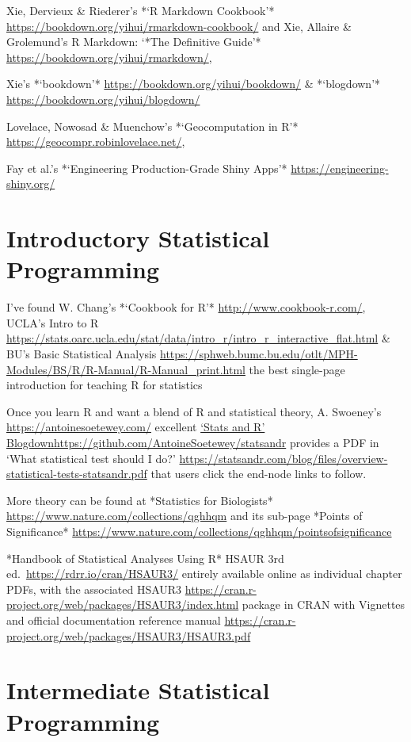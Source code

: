 \documentclass[
]{book}
\begin{document}
Xie, Dervieux \& Riederer's *`R Markdown Cookbook'* \url{https://bookdown.org/yihui/rmarkdown-cookbook/} and Xie, Allaire \& Grolemund's R Markdown: `*The Definitive Guide'* \url{https://bookdown.org/yihui/rmarkdown/},

Xie's *`bookdown'* \url{https://bookdown.org/yihui/bookdown/} \& *`blogdown'* \url{https://bookdown.org/yihui/blogdown/}

Lovelace, Nowosad \& Muenchow's *`Geocomputation in R'* \url{https://geocompr.robinlovelace.net/},

Fay et al.'s *`Engineering Production-Grade Shiny Apps'* \url{https://engineering-shiny.org/}

\section{Introductory Statistical Programming}\label{introductory-statistical-programming}

I've found W. Chang's *`Cookbook for R'* \url{http://www.cookbook-r.com/}, UCLA's Intro to R \url{https://stats.oarc.ucla.edu/stat/data/intro_r/intro_r_interactive_flat.html} \& BU's Basic Statistical Analysis \url{https://sphweb.bumc.bu.edu/otlt/MPH-Modules/BS/R/R-Manual/R-Manual_print.html} the best single-page introduction for teaching R for statistics

Once you learn R and want a blend of R and statistical theory, A. Swoeney's \url{https://antoinesoetewey.com/} excellent \href{\%5Bhttps://github.com/AntoineSoetewey/statsandr}{`Stats and R' Blogdown}\url{https://github.com/AntoineSoetewey/statsandr} provides a PDF in `What statistical test should I do?' \url{https://statsandr.com/blog/files/overview-statistical-tests-statsandr.pdf} that users click the end-node links to follow.

More theory can be found at *Statistics for Biologists* \url{https://www.nature.com/collections/qghhqm} and its sub-page *Points of Significance* \url{https://www.nature.com/collections/qghhqm/pointsofsignificance}

*Handbook of Statistical Analyses Using R* HSAUR 3rd ed.~\url{https://rdrr.io/cran/HSAUR3/} entirely available online as individual chapter PDFs, with the associated HSAUR3 \url{https://cran.r-project.org/web/packages/HSAUR3/index.html} package in CRAN with Vignettes and official documentation reference manual \url{https://cran.r-project.org/web/packages/HSAUR3/HSAUR3.pdf}

\section{Intermediate Statistical Programming}\label{intermediate-statistical-programming}
\end{document}
